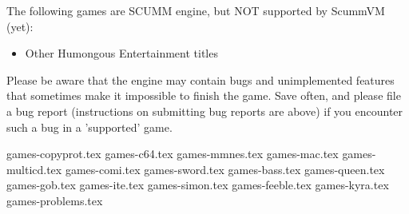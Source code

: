 \begin{itemize}
The following games are SCUMM engine, but NOT supported by ScummVM (yet):

  \begin{itemize}
  \item Other Humongous Entertainment titles
  \end{itemize}

Please be aware that the engine may contain bugs and unimplemented features
that sometimes make it impossible to finish the game. Save often, and please
file a bug report (instructions on submitting bug reports are above) if you
encounter such a bug in a 'supported' game.

\end{itemize}


 {games-copyprot.tex}
 {games-c64.tex}
 {games-mmnes.tex}
 {games-mac.tex}
 {games-multicd.tex}
 {games-comi.tex}
 {games-sword.tex}
 {games-bass.tex}
 {games-queen.tex}
 {games-gob.tex}
 {games-ite.tex}
 {games-simon.tex}
 {games-feeble.tex}
 {games-kyra.tex}
 {games-problems.tex}

